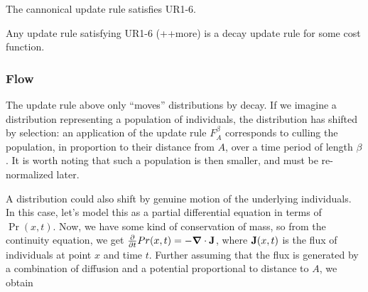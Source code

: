 \documentclass{article}
\begin{document}


\begin{prop}
    The cannonical update rule satisfies UR1-6.
\end{prop}




\begin{conj}
    Any update rule satisfying UR1-6 (++more) is a decay update rule for some cost function.
\end{conj}


\subsubsection{Flow}
\def\vgrad{\boldsymbol\nabla}
The update rule above only ``moves'' distributions by decay. If we imagine a distribution representing a population of individuals, the distribution has shifted by selection: an application of the update rule $F_A^\beta$ corresponds to culling the population, in proportion to their distance from $A$, over a time period of length $\beta$.
It is worth noting that such a population is then smaller, and must be re-normalized later.

A distribution could also shift by genuine motion of the underlying individuals.
In this case, let's model this as a partial differential equation in terms of $\Pr(x,t)$.
Now, we have some kind of conservation of mass, so from the continuity equation, we get
$\frac{\partial }{\partial t}Pr(x,t) = - \vgrad \cdot \mat J$,
where $\mathbf{J}(x,t)$ is the flux of individuals at point $x$ and time $t$.
Further assuming that the flux is generated by a combination of diffusion and a potential proportional to distance to $A$, we obtain
\end{document}

